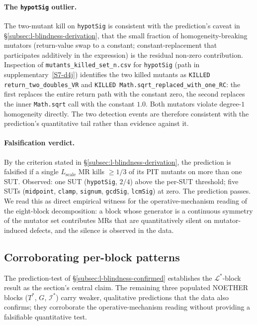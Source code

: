 \paragraph{The \texttt{hypotSig} outlier.}
The two-mutant kill on \texttt{hypotSig} is consistent with the
prediction's caveat in \S\ref{subsec:l-blindness-derivation}, that
the small fraction of homogeneity-breaking mutators (return-value
swap to a constant; constant-replacement that participates additively
in the expression) is the residual non-zero contribution. Inspection
of \texttt{mutants\_killed\_set\_n.csv} for \texttt{hypotSig} (path
in supplementary~\ref{S7-d4j}) identifies the two killed mutants as
\texttt{KILLED\,return\_two\_doubles\_VR} and
\texttt{KILLED\,Math.sqrt\_replaced\_with\_one\_RC}: the first
replaces the entire return path with the constant zero, the second
replaces the inner \texttt{Math.sqrt} call with the constant $1.0$.
Both mutators violate degree-$1$ homogeneity directly. The two
detection events are therefore consistent with the prediction's
quantitative tail rather than evidence against it.

\paragraph{Falsification verdict.}
By the criterion stated in \S\ref{subsec:l-blindness-derivation}, the
prediction is falsified if a single $L_{\mathrm{scale}}$ MR kills
$\ge 1/3$ of its PIT mutants on more than one SUT. Observed: one SUT
(\texttt{hypotSig}, $2/4$) above the per-SUT threshold; five SUTs
(\texttt{midpoint}, \texttt{clamp}, \texttt{signum}, \texttt{gcdSig},
\texttt{lcmSig}) at zero. The prediction passes. We read this as
direct empirical witness for the operative-mechanism reading of the
eight-block decomposition: a block whose generator is a continuous
symmetry of the mutator set contributes MRs that are quantitatively
silent on mutator-induced defects, and the silence is observed in
the data.

\subsection{Corroborating per-block patterns}
\label{subsec:other-blocks}

The prediction-test of
\S\ref{subsec:l-blindness-confirmed} establishes the
$\mathcal{L}^{*}$-block result as the section's central claim. The
remaining three populated NOETHER blocks ($T^{*}$, $G$,
$\mathcal{I}^{*}$) carry weaker, qualitative predictions that the
data also confirms; they corroborate the operative-mechanism reading
without providing a falsifiable quantitative test.

